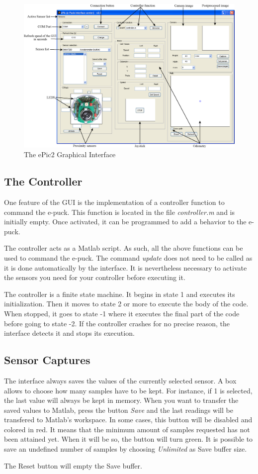 \documentclass[11pt,oneside,english,a4paper]{article}
\begin{document}
\begin{figure}[htb]
	\centering
		\includegraphics[width=1.10\textwidth]{ePic2.png}
	\caption{The ePic2 Graphical Interface\label{fig:epic}}
\end{figure}

\subsection{The Controller}
One feature of the GUI is the implementation of a controller function to command the e-puck. This function is located in the file \emph{controller.m} and is initially empty. Once activated, it can be programmed to add a behavior to the e-puck.
\par The controller acts as a Matlab script. As such, all the above functions can be used to command the e-puck. The command \emph{update} does not need to be called as it is done automatically by the interface. It is nevertheless necessary to activate the sensors you need for your controller before executing it.
\par The controller is a finite state machine. It begins in state 1 and executes its initialization. Then it moves to state 2 or more to execute the body of the code. When stopped, it goes to state -1 where it executes the final part of the code before going to state -2. If the controller crashes for no precise reason, the interface detects it and stops its execution.

\subsection{Sensor Captures}
The interface always saves the values of the currently selected sensor. A box allows to choose how many samples have to be kept. For instance, if 1 is selected, the last value will always be kept in memory. When you want to transfer the saved values to Matlab, press the button \emph{Save} and the last readings will be transfered to Matlab's workspace. In some cases, this button will be disabled and colored in red. It means that the minimum amount of samples requested has not been attained yet. When it will be so, the button will turn green. It is possible to save an undefined number of samples by choosing \emph{Unlimited} as Save buffer size.
\par The Reset button will empty the Save buffer. 
\end{document}

